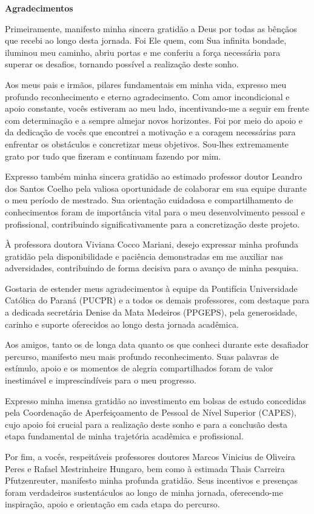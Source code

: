 \begin{center}
    \textbf{Agradecimentos}
\end{center}

Primeiramente, manifesto minha sincera gratidão a Deus por todas as bênçãos que recebi ao longo desta jornada. Foi Ele quem, com Sua infinita bondade, iluminou meu caminho, abriu portas e me conferiu a força necessária para superar os desafios, tornando possível a realização deste sonho.

Aos meus pais e irmãos, pilares fundamentais em minha vida, expresso meu profundo reconhecimento e eterno agradecimento. Com amor incondicional e apoio constante, vocês estiveram ao meu lado, incentivando-me a seguir em frente com determinação e a sempre almejar novos horizontes. Foi por meio do apoio e da dedicação de vocês que encontrei a motivação e a coragem necessárias para enfrentar os obstáculos e concretizar meus objetivos. Sou-lhes extremamente grato por tudo que fizeram e continuam fazendo por mim.

Expresso também minha sincera gratidão ao estimado professor doutor Leandro dos Santos Coelho pela valiosa oportunidade de colaborar em sua equipe durante o meu período de mestrado. Sua orientação cuidadosa e compartilhamento de conhecimentos foram de importância vital para o meu desenvolvimento pessoal e profissional, contribuindo significativamente para a concretização deste projeto.

À professora doutora Viviana Cocco Mariani, desejo expressar minha profunda gratidão pela disponibilidade e paciência demonstradas em me auxiliar nas adversidades, contribuindo de forma decisiva para o avanço de minha pesquisa.

Gostaria de estender meus agradecimentos à equipe da Pontifícia Universidade Católica do Paraná (PUCPR) e a todos os demais professores, com destaque para a dedicada secretária Denise da Mata Medeiros (PPGEPS), pela generosidade, carinho e suporte oferecidos ao longo desta jornada acadêmica.

Aos amigos, tanto os de longa data quanto os que conheci durante este desafiador percurso, manifesto meu mais profundo reconhecimento. Suas palavras de estímulo, apoio e os momentos de alegria compartilhados foram de valor inestimável e imprescindíveis para o meu progresso.

Expresso minha imensa gratidão ao investimento em bolsas de estudo concedidas pela Coordenação de Aperfeiçoamento de Pessoal de Nível Superior (CAPES), cujo apoio foi crucial para a realização deste sonho e para a conclusão desta etapa fundamental de minha trajetória acadêmica e profissional.

Por fim, a vocês, respeitáveis professores doutores Marcos Vinicius de Oliveira Peres e Rafael Mestrinheire Hungaro, bem como à estimada Thais Carreira Pfutzenreuter, manifesto minha profunda gratidão. Seus incentivos e presenças foram verdadeiros sustentáculos ao longo de minha jornada, oferecendo-me inspiração, apoio e orientação em cada etapa do percurso. 